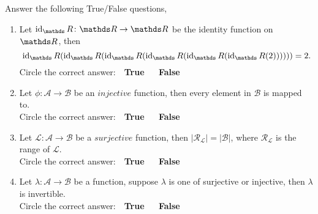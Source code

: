 \documentclass[12pt]{article} %
\begin{document}
\begin{qstn}[1][(8 points)] %
  Answer the following True/False questions,
  \begin{enumerate}
    \item Let $\operatorname{id}_\R \colon \R \to \R$ be the identity function on $\R$, then
       \[
              \operatorname{id}_\R\left(\operatorname{id}_\R\left(\operatorname{id}_\R\left(\operatorname{id}_\R\left(\operatorname{id}_\R\left(\operatorname{id}_\R\left(2
              \right) \right) \right) \right) \right) \right) = 2
      .\] 
      Circle the correct answer: \,\, \textbf{True} \,\,\,\,\,\, \textbf{False}

    \item Let $\phi \colon \mathcal{A} \to \mathcal{B}$ be an $\textit{injective}$ function, then every element in
      $\mathcal{B}$ is mapped to.\\
          Circle the correct answer: \,\, \textbf{True} \,\,\,\,\,\, \textbf{False}

    \item Let $\mathcal{L} \colon \mathcal{A} \to \mathcal{B}$ be a $\textit{surjective}$ function, then
          $\left|\mathcal{R_\mathcal{L}}\right| = \left|\mathcal{B}\right|$, where $\mathcal{R_\mathcal{L}}$ is the
          range of $\mathcal{L}$.\\
          Circle the correct answer: \,\, \textbf{True} \,\,\,\,\,\, \textbf{False}

    \item Let $\lambda \colon \mathcal{A} \to \mathcal{B}$ be a function, suppose $\lambda$ is one of surjective or
      injective, then $\lambda$ is invertible.\\
          Circle the correct answer: \,\, \textbf{True} \,\,\,\,\,\, \textbf{False}


\end{enumerate}
\end{qstn}
\end{document}
